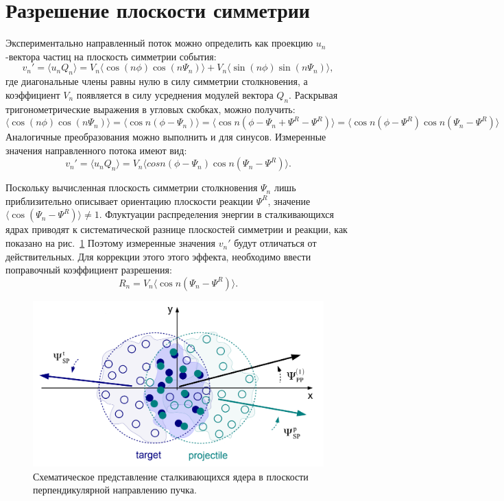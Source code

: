 \section{Разрешение плоскости симметрии}

Экспериментально направленный поток можно определить как проекцию $u_n$-вектора частиц на плоскость симметрии события:
%
\begin{equation}
    v_n' =  \langle u_n Q_n \rangle = 
    V_n \langle \cos (n\phi) \cos (n\Psi_n) \rangle + V_n \langle \sin(n\phi) \sin(n\Psi_n) \rangle,
\end{equation}
%
где диагональные члены равны нулю в силу симметрии столкновения, а коэффициент $V_n$ появляется в силу усреднения модулей вектора $Q_n$.
Раскрывая тригонометрические выражения в угловых скобках, можно получить:
%
\begin{equation}
    \langle \cos (n\phi) \cos (n\Psi_n) \rangle = \langle \cos n ( \phi - \Psi_n ) \rangle = 
    \langle \cos n ( \phi - \Psi_n + \Psi^R - \Psi^R ) \rangle =
    \langle \cos n ( \phi - \Psi^R ) \cos n (\Psi_n - \Psi^R ) \rangle
\end{equation}
%
Аналогичные преобразования можно выполнить и для синусов. 
Измеренные значения направленного потока имеют вид:
%
\begin{equation}
    v_n' =  \langle u_n Q_n \rangle = 
    V_n \langle cos n ( \phi - \Psi_n ) \cos n (\Psi_n - \Psi^R) \rangle.
    \label{eq:uq_transformation}
\end{equation}
%

Поскольку вычисленная плоскость симметрии столкновения $\Psi_n$ лишь приблизительно описывает ориентацию плоскости реакции $\Psi^R$, значение $ \langle \cos(\Psi_n - \Psi^R) \rangle \ne 1 $.
Флуктуации распределения энергии в сталкивающихся ядрах приводят к систематической разнице плоскостей симметрии и реакции, как показано на рис.~\ref{fig:pp_sp_rp}
Поэтому измеренные значения $v_n'$ будут отличаться от действительных.
Для коррекции этого этого эффекта, необходимо ввести поправочный коэффициент разрешения:
%
\begin{equation}
    R_n = V_n \langle \cos n (\Psi_n - \Psi^R) \rangle.
\end{equation}
%

%
\begin{figure}[ht]
\begin{center}
\includegraphics[width=0.75\linewidth]{images/v1_pp_sp.png}
\caption{Схематическое представление сталкивающихся ядера в плоскости перпендикулярной направлению пучка.}
\label{fig:pp_sp_rp}
\end{center}
\end{figure}
%

